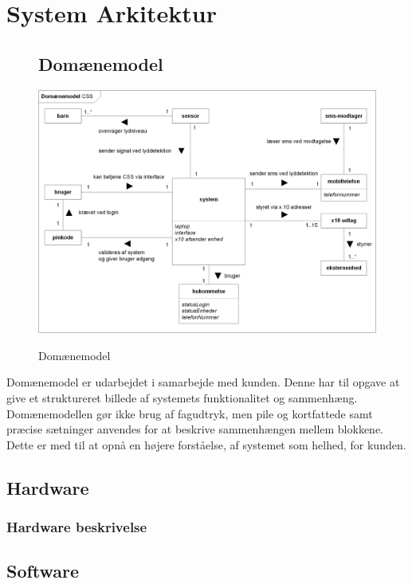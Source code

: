 %
%
\chapter{System Arkitektur}

\begin{figure}[htbp] \centering
\section{Domænemodel}
{\includegraphics[width=\textwidth]{billeder/diagrammer/Domain_Model}}
\caption{Domænemodel}
\label{lab:domainmodel}
\end{figure}
Domænemodel er udarbejdet i samarbejde med kunden. Denne har til opgave at give et struktureret billede af systemets funktionalitet og sammenhæng. Domænemodellen gør ikke brug af fagudtryk, men pile og kortfattede samt præcise sætninger anvendes for at beskrive sammenhængen mellem blokkene. Dette er med til at opnå en højere forståelse, af systemet som helhed, for kunden.

\newpage
\section{Hardware}

\subsection{Hardware beskrivelse}


\clearpage
\section{Software}


